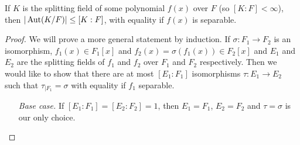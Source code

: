 \documentclass[12pt]{article}
\begin{document}
\begin{proposition}
    If $K$ is the splitting field of some polynomial $f(x)$ over $F$ (so $[K:F]<\infty$), then $|\operatorname{Aut}(K/F)|\leq [K:F]$, with equality if $f(x)$ is separable.
\end{proposition}
\begin{proof}
    We will prove a more general statement by induction.
    If $\sigma:F_1\to F_2$ is an isomorphism, $f_1(x)\in F_1[x]$ and $f_2(x)=\sigma(f_1(x))\in F_2[x]$ and $E_1$ and $E_2$ are the splitting fields of $f_1$ and $f_2$ over $F_1$ and $F_2$ respectively. Then we would like to show that there are at most $[E_1:F_1]$ isomorphisms $\tau: E_1\to E_2$ such that $\tau_{|F_1}=\sigma$ with equality if $f_1$ separable.

    \begin{enumerate}[align=left]
        \item[\textit{Base case. }] If $[E_1:F_1]=[E_2:F_2]=1$, then $E_1=F_1$, $E_2=F_2$ and $\tau=\sigma$ is our only choice.
        

\end{enumerate}
\end{proof}
\end{document}
